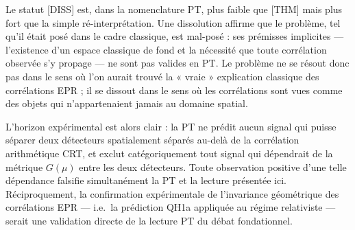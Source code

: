 Le statut [DISS] est, dans la nomenclature PT, plus faible que
[THM] mais plus fort que la simple ré-interprétation. Une
dissolution affirme que le problème, tel qu'il était posé dans le
cadre classique, est mal-posé : ses prémisses
implicites --- l'existence d'un espace classique de fond et la
nécessité que toute corrélation observée s'y propage --- ne sont
pas valides en PT. Le problème ne se résout donc pas dans le sens
où l'on aurait trouvé la « vraie » explication classique des
corrélations EPR ; il se dissout dans le sens où les corrélations
sont vues comme des objets qui n'appartenaient jamais au domaine
spatial.

L'horizon expérimental est alors clair : la PT ne prédit aucun
signal qui puisse séparer deux détecteurs spatialement séparés
au-delà de la corrélation arithmétique CRT, et exclut
catégoriquement tout signal qui dépendrait de la métrique
$G(\mu)$ entre les deux détecteurs. Toute observation positive
d'une telle dépendance falsifie simultanément la PT et la
lecture présentée ici. Réciproquement, la confirmation
expérimentale de l'invariance géométrique des corrélations EPR ---
i.e.\ la prédiction QH1a appliquée au régime relativiste --- serait
une validation directe de la lecture PT du débat fondationnel.
